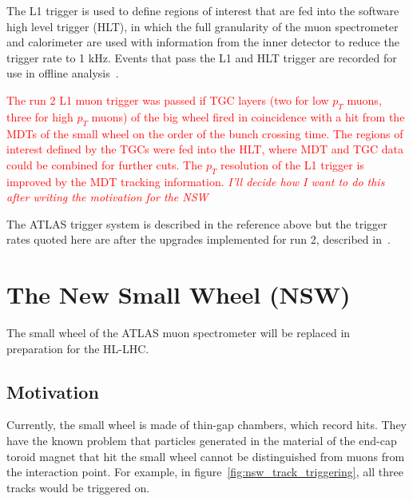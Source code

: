 The L1 trigger is used to define regions of interest that are fed into the software high level trigger (HLT), in which the full granularity of the muon spectrometer and calorimeter are used with information from the inner detector to reduce the trigger rate to 1 kHz. Events that pass the L1 and HLT trigger are recorded for use in offline analysis~\cite{atlas_hlt_trigger_tdr}.

\textcolor{red}{The run 2 L1 muon trigger was passed if TGC layers (two for low $p_T$ muons, three for high $p_T$ muons) of the big wheel fired in coincidence with a hit from the MDTs of the small wheel on the order of the bunch crossing time. The regions of interest defined by the TGCs were fed into the HLT, where MDT and TGC data could be combined for further cuts. The $p_T$ resolution of the L1 trigger is improved by the MDT tracking information. \textit{I'll decide how I want to do this after writing the motivation for the NSW}}

The ATLAS trigger system is described in the reference above but the trigger rates quoted here are after the upgrades implemented for run 2, described in~\cite{martinez_run-2_2016}.

\section{The New Small Wheel (NSW)}

The small wheel of the ATLAS muon spectrometer will be replaced in preparation for the HL-LHC. 
\subsection{Motivation}
Currently, the small wheel is made of thin-gap chambers, which record hits. They have the known problem that particles generated in the material of the end-cap toroid magnet that hit the small wheel cannot be distinguished from muons from the interaction point. For example, in figure~\ref{fig:nsw_track_triggering}, all three tracks would be triggered on.

